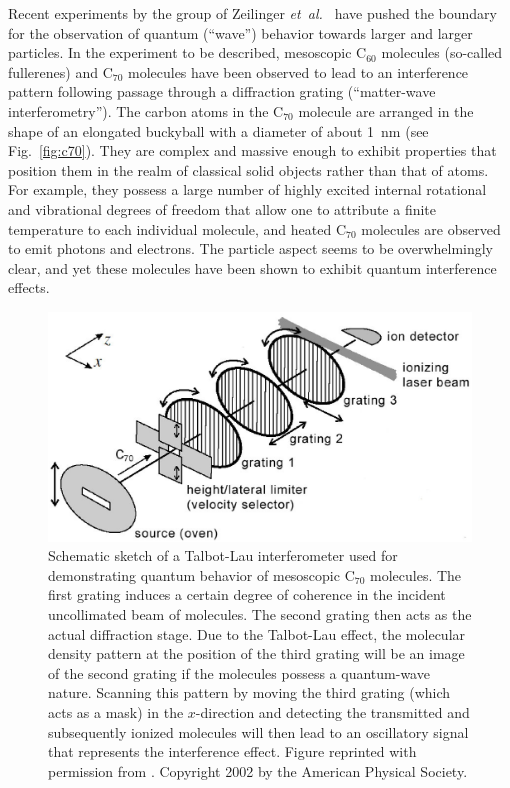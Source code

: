 \documentclass[12pt,aps,floatfix,amsmath,amssymb,showpacs,nofootinbib]{revtex4-2}
\newcommand{\etal}{\emph{et~al.\ }}
\begin{document}
Recent experiments by the group of Zeilinger \etal
\cite{Arndt:1999:rc,Brezger:2002:mu,Hackermueller:2002:wb,Arndt:2002:bo,Nairz:2003:um,Hornberger:2003:tv,%
Hackermuller:2003:uu,Hackermuller:2004:rd,Hornberger:2005:mo} have pushed the boundary for the
observation of quantum (``wave'') behavior towards larger and larger
particles. In the experiment to be described, mesoscopic C$_{60}$
molecules (so-called fullerenes) and C$_{70}$ molecules have been
observed to lead to an interference pattern following passage through
a diffraction grating (``matter-wave interferometry'').  The carbon
atoms in the C$_{70}$ molecule are arranged in the shape of an
elongated buckyball with a diameter of about 1~nm (see
Fig.~\ref{fig:c70}). They are complex and massive enough to exhibit
properties that position them in the realm of classical solid objects
rather than that of atoms. For example, they possess a large number of
highly excited internal rotational and vibrational degrees of freedom
that allow one to attribute a finite temperature to each individual
molecule, and heated C$_{70}$ molecules are observed to emit photons
and electrons. The particle aspect seems to be overwhelmingly clear,
and yet these molecules have been shown to exhibit quantum
interference effects.

\begin{figure}
\begin{center}
\includegraphics[scale=.42]{talbotlau-n.eps}
\end{center}
\caption[Schematic sketch of a Talbot-Lau
interferometer]{\label{fig:talbotlau} Schematic sketch of a Talbot-Lau
  interferometer used for demonstrating quantum behavior of mesoscopic
  C$_{70}$ molecules. The first grating induces a certain degree of
  coherence in the incident uncollimated beam of molecules. The second
  grating then acts as the actual diffraction stage. Due to the
  Talbot-Lau effect, the molecular density pattern at the position of
  the third grating will be an image of the second grating if the
  molecules possess a quantum-wave nature. Scanning this pattern by
  moving the third grating (which acts as a mask) in the $x$-direction
  and detecting the transmitted and subsequently ionized molecules
  will then lead to an oscillatory signal that represents the
  interference effect.  Figure reprinted with permission from
  \cite{Brezger:2002:mu}. Copyright 2002 by the American Physical
  Society.}
\end{figure}
\end{document}
